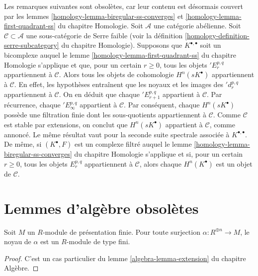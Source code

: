 \begin{remark}
\label{remark-weak-serre-subcategory}
Les remarques suivantes sont obsolètes, car leur contenu est désormais couvert
par les lemmes \ref{homology-lemma-biregular-ss-converges} et
\ref{homology-lemma-first-quadrant-ss} du chapitre Homologie.
Soit $\mathcal{A}$ une catégorie abélienne.
Soit $\mathcal{C} \subset \mathcal{A}$
une sous-catégorie de Serre faible (voir la définition
\ref{homology-definition-serre-subcategory} du chapitre Homologie).
Supposons que $K^{\bullet, \bullet}$ soit un bicomplexe auquel
le lemme \ref{homology-lemma-first-quadrant-ss} du chapitre Homologie
s'applique et que, pour un certain $r \geq 0$, tous les objets
${}'E_r^{p, q}$ appartiennent à $\mathcal{C}$. Alors tous les objets de cohomologie
$H^n(sK^\bullet)$ appartiennent à $\mathcal{C}$. En effet, les hypothèses entraînent
que les noyaux et les images des ${}'d_r^{p, q}$ appartiennent à $\mathcal{C}$.
On en déduit que chaque ${}'E_{r + 1}^{p, q}$ appartient à $\mathcal{C}$.
Par récurrence, chaque ${}'E_\infty^{p, q}$ appartient à $\mathcal{C}$.
Par conséquent, chaque $H^n(sK^\bullet)$ possède une filtration finie dont les
sous-quotients appartiennent à $\mathcal{C}$. Comme $\mathcal{C}$ est stable par
extensions, on conclut que $H^n(sK^\bullet)$ appartient à $\mathcal{C}$, comme annoncé.
Le même résultat vaut pour la seconde suite spectrale associée
à $K^{\bullet, \bullet}$. De même, si $(K^\bullet, F)$ est un complexe filtré auquel
le lemme \ref{homology-lemma-biregular-ss-converges} du chapitre Homologie
s'applique et si, pour un certain $r \geq 0$, tous les objets $E_r^{p, q}$
appartiennent à $\mathcal{C}$, alors chaque $H^n(K^\bullet)$ est
un objet de $\mathcal{C}$.
\end{remark}




\section{Lemmes d'algèbre obsolètes}
\label{section-algebra}

\begin{lemma}
\label{lemma-finite-presentation-module-independent}
Soit $M$ un $R$-module de présentation finie.
Pour toute surjection $\alpha : R^{\oplus n} \to M$, le
noyau de $\alpha$ est un $R$-module de type fini.
\end{lemma}

\begin{proof}
C'est un cas particulier du lemme \ref{algebra-lemma-extension} du chapitre Algèbre.
\end{proof}

